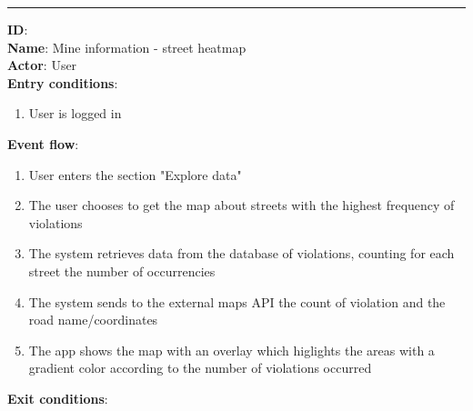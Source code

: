   \rule{\linewidth}{0.4pt}
	\textbf{ID}:  \\
	\textbf{Name}: Mine information - street heatmap \\
	\textbf{Actor}: User  \\
	\textbf{Entry conditions}:
	\begin{enumerate}
		\item{User is logged in}
	\end{enumerate}
	\textbf{Event flow}:
	\begin{enumerate}
		\item{User enters the section "Explore data"}
    \item{The user chooses to get the map about streets with the highest frequency of violations}
    \item{The system retrieves data from the database of violations, counting for each street the number of occurrencies}
    \item{The system sends to the external maps API the count of violation and the road name/coordinates}
    \item{The app shows the map with an overlay which higlights the areas with a gradient color according to the number of violations occurred}
	\end{enumerate}
	\textbf{Exit conditions}:
